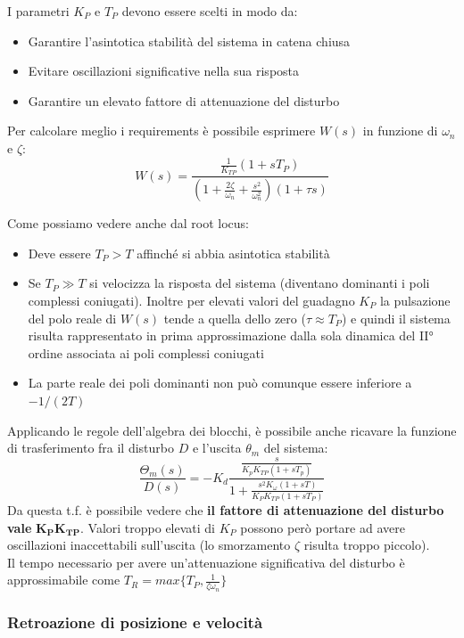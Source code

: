 I parametri $K_P$ e $T_P$ devono essere scelti in modo da:
\begin{itemize}
	\item Garantire l’asintotica stabilità del sistema in catena chiusa
	\item Evitare oscillazioni significative nella sua risposta
	\item Garantire un elevato fattore di attenuazione del disturbo 
\end{itemize}


Per calcolare meglio i requirements è possibile esprimere $W(s)$ in funzione di $\omega_n$ e $\zeta$:
$$
W(s) = \frac{\frac{1}{K_{TP}}(1+sT_P)}{\left( 1 + \frac{2\zeta}{\omega_n} + \frac{s^2}{\omega_n^2} \right) (1+\tau s) }
$$

Come possiamo vedere anche dal root locus:
\begin{itemize}
	\item Deve essere $T_P > T$ affinché si abbia asintotica stabilità
	\item Se $T_P \gg T$ si velocizza la risposta del sistema (diventano dominanti i poli complessi coniugati). Inoltre per elevati valori del guadagno $K_P$ la pulsazione del polo reale di $W(s)$ tende a quella dello zero ($\tau \approx T_P$) e quindi il sistema risulta rappresentato in prima approssimazione dalla sola dinamica del II° ordine associata ai poli complessi coniugati
	\item La parte reale dei poli dominanti non può comunque essere inferiore a $-1/(2T)$
\end{itemize}

Applicando le regole dell'algebra dei blocchi, è possibile anche ricavare la funzione di trasferimento fra il disturbo $D$ e l’uscita $\theta_m$ del sistema:
$$
\frac{\Theta_m(s)}{D(s)} = 
-K_d\frac{
\frac{s}{K_pK_{TP}(1+sT_p)}
}
{1 + \frac{s^2K_\omega(1+sT)}{K_PK_{TP}(1+sT_P)}}
$$
Da questa t.f. è possibile vedere che \textbf{il fattore di attenuazione del disturbo vale} $\mathbf{K_PK_{TP}}$. Valori troppo elevati di $K_P$ possono però portare ad avere oscillazioni inaccettabili sull’uscita (lo smorzamento $\zeta$ risulta troppo piccolo).\\
Il tempo necessario per avere un’attenuazione significativa del disturbo è approssimabile come $T_R = max\{T_P, \frac{1}{\zeta \omega_n}\}$








\vspace{35pt}
\subsubsection{Retroazione di posizione e velocità}


